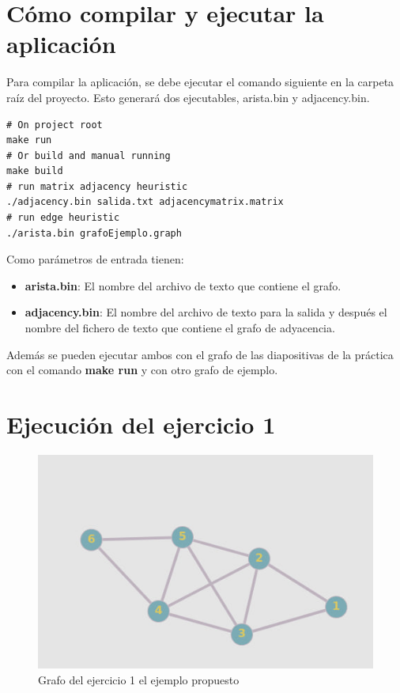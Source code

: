 \newpage

\section {Cómo compilar y ejecutar la aplicación}

Para compilar la aplicación, se debe ejecutar el comando siguiente en la carpeta raíz del proyecto. Esto generará dos ejecutables, arista.bin y adjacency.bin.

\begin{lstlisting}[style=mybash]
# On project root
make run
# Or build and manual running
make build
# run matrix adjacency heuristic
./adjacency.bin salida.txt adjacencymatrix.matrix
# run edge heuristic
./arista.bin grafoEjemplo.graph
\end{lstlisting}

Como parámetros de entrada tienen:
\begin{itemize}
    \item \textbf{arista.bin}: El nombre del archivo de texto que contiene el grafo.
    \item \textbf{adjacency.bin}: El nombre del archivo de texto para la salida y después el nombre del fichero de texto que contiene el grafo de adyacencia.
\end{itemize}

Además se pueden ejecutar ambos con el grafo de las diapositivas de la práctica con el comando \textbf{make run} y con otro grafo de ejemplo. 

\newpage
\section{Ejecución del ejercicio 1}

\begin{figure}[H]
	\centering
	\includegraphics[scale=0.40]{grafo_ejercicio1}
	\caption{Grafo del ejercicio 1 el ejemplo propuesto}
\end{figure}


